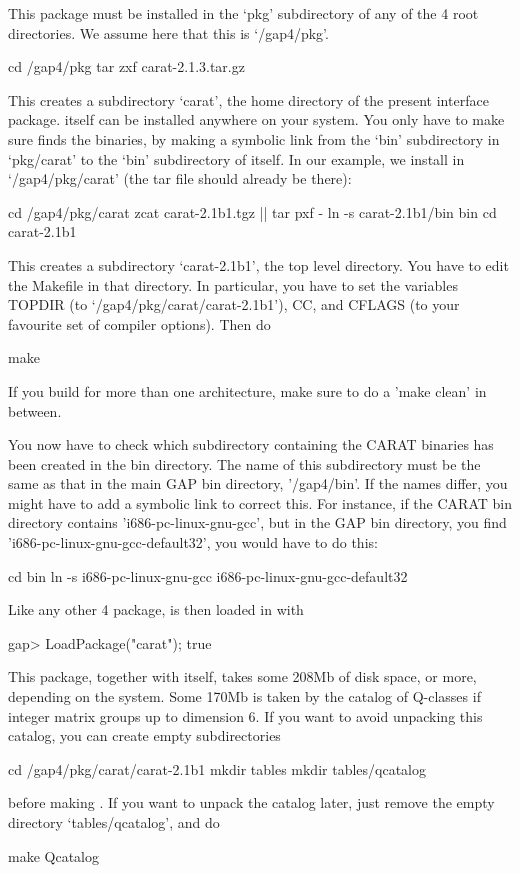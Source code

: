 
This package must be installed in the `pkg' subdirectory of any of
the {\GAP} 4 root directories. We assume here that this is `/gap4/pkg'.

\begintt
cd /gap4/pkg
tar zxf carat-2.1.3.tar.gz
\endtt

This creates a subdirectory `carat', the home directory of the present
interface package. {\CARAT} itself can be installed anywhere on your 
system. You only have to make sure {\GAP} finds the {\CARAT} binaries, 
by making a symbolic link from the `bin' subdirectory in `pkg/carat' to 
the `bin' subdirectory of {\CARAT} itself. In our example, we install 
{\CARAT} in `/gap4/pkg/carat' (the {\CARAT} tar file should already be 
there):

\begintt
cd /gap4/pkg/carat
zcat carat-2.1b1.tgz || tar pxf -
ln -s carat-2.1b1/bin bin
cd carat-2.1b1
\endtt

This creates a subdirectory `carat-2.1b1', the {\CARAT} top level directory. 
You have to edit the Makefile in that directory. In particular, you have 
to set the variables TOPDIR (to `/gap4/pkg/carat/carat-2.1b1'), CC, and 
CFLAGS (to your favourite set of compiler options). Then do 

\begintt
make
\endtt

If you build for more than one architecture, make sure to do a 
'make clean' in between.

You now have to check which subdirectory containing the CARAT 
binaries has been created in the bin directory. The name of this
subdirectory must be the same as that in the main GAP bin directory,
'/gap4/bin'. If the names differ, you might have to add a symbolic
link to correct this. For instance, if the CARAT bin directory
contains 'i686-pc-linux-gnu-gcc', but in the GAP bin directory,
you find 'i686-pc-linux-gnu-gcc-default32', you would have to do this:

\begintt
cd bin
ln -s i686-pc-linux-gnu-gcc i686-pc-linux-gnu-gcc-default32
\endtt

Like any other {\GAP} 4 package, {\CARAT} is then loaded in {\GAP} with

\beginexample
gap> LoadPackage("carat");
true
\endexample

This package, together with {\CARAT} itself, takes some 208Mb of disk space,
or more, depending on the system. Some 170Mb is taken by the catalog
of Q-classes if integer matrix groups up to dimension 6. If you want
to avoid unpacking this catalog, you can create empty subdirectories

\begintt
cd /gap4/pkg/carat/carat-2.1b1
mkdir tables
mkdir tables/qcatalog
\endtt

before making {\CARAT}. If you want to unpack the catalog later, just
remove the empty directory `tables/qcatalog', and do

\begintt
make Qcatalog
\endtt

